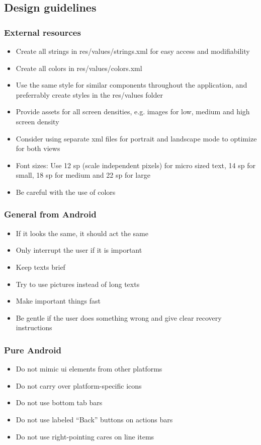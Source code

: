 \subsection{Design guidelines}

\subsubsection{External resources}
\begin{itemize}
\item{}Create all strings in res/values/strings.xml for easy access and modifiability
\item{}Create all colors in res/values/colors.xml 
\item{}Use the same style for similar components throughout the application, and preferrably create styles in the res/values folder
\item{}Provide assets for all screen densities, e.g. images for low, medium and high screen density
\item{}Consider using separate \gls{xml} files for portrait and landscape mode to optimize for both views
\item{}Font sizes: Use 12 \gls{sp} (scale independent pixels) for micro sized text, 14 \gls{sp} for small, 18 \gls{sp} for medium and 22 \gls{sp} for large
\item{}Be careful with the use of colors
\end{itemize}

\subsubsection{General from Android \cite{bib:android}}
\begin{itemize}
\item{}If it looks the same, it should act the same
\item{}Only interrupt the user if it is important
\item{}Keep texts brief 
\item{}Try to use pictures instead of long texts
\item{}Make important things fast
\item{}Be gentle if the user does something wrong and give clear recovery instructions
\end{itemize}

\subsubsection{Pure Android \cite{bib:pandroid}}
\begin{itemize}
\item{}Do not mimic \gls{ui} elements from other platforms
\item{}Do not carry over platform-specific icons
\item{}Do not use bottom tab bars
\item{}Do not use labeled “Back” buttons on actions bars
\item{}Do not use right-pointing cares on line items 
\end{itemize}